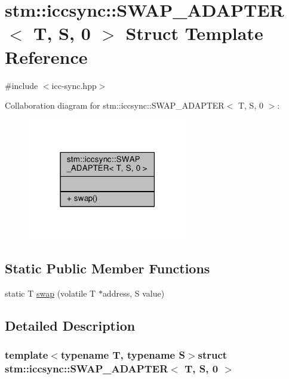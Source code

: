 \hypertarget{structstm_1_1iccsync_1_1SWAP__ADAPTER_3_01T_00_01S_00_010_01_4}{\section{stm\-:\-:iccsync\-:\-:S\-W\-A\-P\-\_\-\-A\-D\-A\-P\-T\-E\-R$<$ T, S, 0 $>$ Struct Template Reference}
\label{structstm_1_1iccsync_1_1SWAP__ADAPTER_3_01T_00_01S_00_010_01_4}
}


{\ttfamily \#include $<$icc-\/sync.\-hpp$>$}



Collaboration diagram for stm\-:\-:iccsync\-:\-:S\-W\-A\-P\-\_\-\-A\-D\-A\-P\-T\-E\-R$<$ T, S, 0 $>$\-:
\nopagebreak
\begin{figure}[H]
\begin{center}
\leavevmode
\includegraphics[width=198pt]{structstm_1_1iccsync_1_1SWAP__ADAPTER_3_01T_00_01S_00_010_01_4__coll__graph}
\end{center}
\end{figure}
\subsection*{Static Public Member Functions}
\begin{DoxyCompactItemize}
\item 
static T \hyperlink{structstm_1_1iccsync_1_1SWAP__ADAPTER_3_01T_00_01S_00_010_01_4_a2d8db66d1bb56c72114c5a6fc9603fd7}{swap} (volatile T $\ast$address, S value)
\end{DoxyCompactItemize}


\subsection{Detailed Description}
\subsubsection*{template$<$typename T, typename S$>$struct stm\-::iccsync\-::\-S\-W\-A\-P\-\_\-\-A\-D\-A\-P\-T\-E\-R$<$ T, S, 0 $>$}

